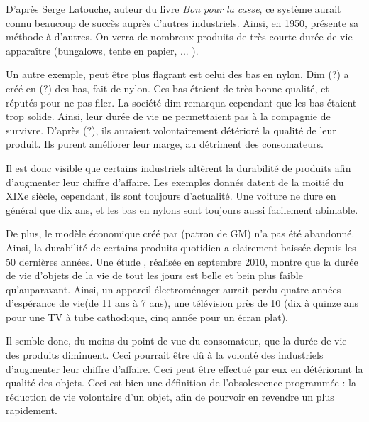 D'après Serge Latouche, auteur du livre \textit{Bon pour la casse}\cite{bpc}, ce système aurait connu beaucoup de succès auprès d'autres industriels. Ainsi, en 1950, présente sa méthode à d'autres. On verra de nombreux produits de très courte durée de vie apparaître  (bungalows, tente en papier, ... ).

Un autre exemple, peut être plus flagrant est celui des bas en nylon.  Dim (?) a créé en (?) des bas, fait de nylon. Ces bas étaient de très bonne qualité, et réputés pour ne pas filer. La société dim remarqua cependant que les bas étaient trop solide. Ainsi, leur durée de vie ne permettaient pas à la compagnie de survivre. D'après (?), ils auraient volontairement détérioré la qualité de leur produit. Ils purent améliorer leur marge, au détriment des consomateurs. 

\smallbreak

Il est donc visible que certains industriels altèrent la durabilité de produits afin d'augmenter leur chiffre d'affaire. Les exemples donnés datent de la moitié du XIXe siècle, cependant, ils sont toujours d'actualité. Une voiture ne dure en général que dix ans, et les bas en nylons sont toujours aussi facilement abimable. 

De plus, le modèle économique créé par (patron de GM) n'a pas été abandonné. Ainsi, la durabilité de certains produits quotidien a clairement baissée depuis les 50 dernières années. 
Une étude \cite{opSsg}, réalisée en septembre 2010, montre que la durée de vie d'objets de la vie de tout les jours est belle et bein plus faible qu'auparavant. Ainsi, un appareil électroménager aurait perdu quatre années d'espérance de vie(de 11 ans à 7 ans), une télévision près de 10 (dix à quinze ans pour une TV à tube cathodique, cinq année pour un écran plat). 

Il semble donc, du moins du point de vue du consomateur, que la durée de vie des produits diminuent. Ceci pourrait être dû à la volonté des industriels d'augmenter leur chiffre d'affaire. Ceci peut être effectué par eux en détériorant la qualité des objets. Ceci est bien une définition de l'obsolescence programmée : la réduction de vie volontaire d'un objet, afin de pourvoir en revendre un plus rapidement. 
